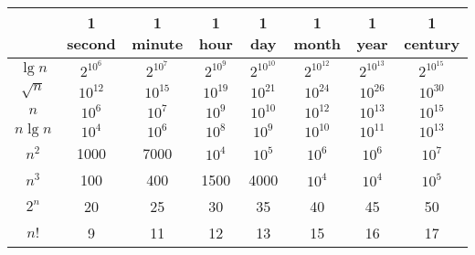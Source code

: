 \begin{center}
	\begin{tabular}{c|c|c|c|c|c|c|c}
		& 1 second & 1 minute & 1 hour & 1 day & 1 month & 1 year & 1 century  \\ \hline
		$\lg n$		& $2^{10^6}$ & $2^{10^7}$ & $2^{10^9}$  & $2^{10^{10}}$ & $2^{10^{12}}$ & $2^{10^{13}}$ & $2^{10^{15}}$ \\ \hline
		$\sqrt{n}$	& $10^{12}$ & $10^{15}$ & $10^{19}$ & $10^{21}$ & $10^{24}$ & $10^{26}$ & $10^{30}$ \\ \hline
		$n$			& $10^{6}$ & $10^{7}$ & $10^{9}$ & $10^{10}$ & $10^{12}$ & $10^{13}$ & $10^{15}$ \\ \hline
		$n \lg n$	& $10^{4}$ & $10^{6}$ & $10^{8}$ & $10^{9}$ & $10^{10}$ & $10^{11}$ & $10^{13}$ \\ \hline
		$n^2$		& 1000 & 7000 & $10^{4}$ & $10^{5}$ & $10^{6}$ & $10^{6}$ & $10^{7}$ \\ \hline
		$n^3$		& 100 & 400 & 1500 & 4000 & $10^{4}$ & $10^{4}$ & $10^{5}$ \\ \hline
		$2^n$		& 20 & 25 & 30 & 35 & 40 & 45 & 50 \\ \hline
		$n!$		& 9 & 11 & 12 & 13 & 15 & 16 & 17
	\end{tabular}
\end{center}
